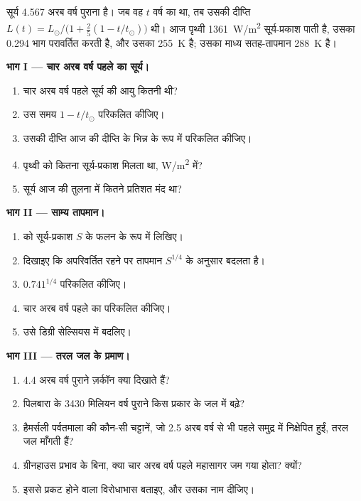 \begin{problem}[{सप्ताहांत समस्या --- मंद युवा सूर्य}]
\label{pb:g12:early-earth:1}
सूर्य \num{4.567} अरब वर्ष पुराना है। जब वह $t$
वर्ष का था, तब उसकी दीप्ति $L(t) = L_\odot/\bigl(1 + \tfrac25 (1 - t/t_\odot)\bigr)$ थी। आज
पृथ्वी \qty{1361}{W/m^2} सूर्य-प्रकाश पाती है, उसका 0.294 भाग परावर्तित करती है,
और उसका  \qty{255}{K} है; उसका माध्य सतह-तापमान
\qty{288}{K} है।

\medskip
\noindent\textbf{भाग I --- चार अरब वर्ष पहले का सूर्य।}
\begin{enumerate}
  \item चार अरब वर्ष पहले सूर्य की आयु कितनी थी?
  \item उस समय $1 - t/t_\odot$ परिकलित कीजिए।
  \item उसकी दीप्ति आज की दीप्ति के भिन्न के रूप में परिकलित कीजिए।
  \item पृथ्वी को कितना सूर्य-प्रकाश मिलता था, \unit{W/m^2} में?
  \item सूर्य आज की तुलना में कितने प्रतिशत मंद था?
\end{enumerate}

\medskip
\noindent\textbf{भाग II --- साम्य तापमान।}
\begin{enumerate}[resume]
  \item {} को सूर्य-प्रकाश $S$ के फलन के रूप में लिखिए।
  \item दिखाइए कि  अपरिवर्तित रहने पर तापमान
        $S^{1/4}$ के अनुसार बदलता है।
  \item $0.741^{1/4}$ परिकलित कीजिए।
  \item चार अरब वर्ष पहले का  परिकलित कीजिए।
  \item उसे डिग्री सेल्सियस में बदलिए।
\end{enumerate}

\medskip
\noindent\textbf{भाग III --- तरल जल के प्रमाण।}
\begin{enumerate}[resume]
  \item 4.4 अरब वर्ष पुराने ज़र्कॉन क्या दिखाते हैं?
  \item पिलबारा के \num{3430} मिलियन वर्ष पुराने 
        किस प्रकार के जल में बढ़े?
  \item हैमर्सली पर्वतमाला की कौन-सी चट्टानें, जो 2.5 अरब वर्ष से भी पहले समुद्र में
        निक्षेपित हुईं, तरल जल माँगती हैं?
  \item ग्रीनहाउस प्रभाव के बिना, क्या चार अरब वर्ष पहले महासागर
        जम गया होता? क्यों?
  \item इससे प्रकट होने वाला विरोधाभास बताइए, और उसका नाम दीजिए।
\end{enumerate}


\end{problem}
